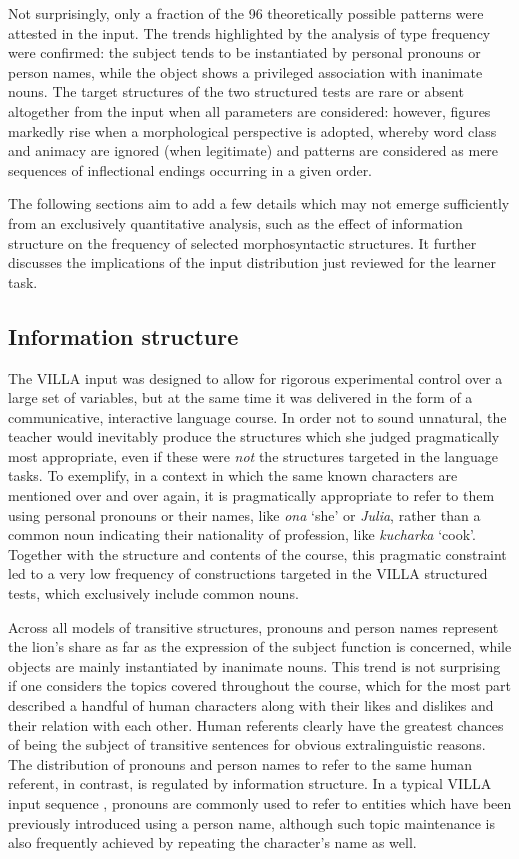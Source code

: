 Not surprisingly, only a fraction of the 96 theoretically possible patterns were attested in the input. The trends highlighted by the analysis of type frequency were confirmed: the subject tends to be instantiated by personal pronouns or person names, while the object shows a privileged association with inanimate nouns. The target structures of the two structured tests are rare or absent altogether from the input when all parameters are considered: however, figures markedly rise when a morphological perspective is adopted, whereby word class and animacy are ignored (when legitimate) and patterns are considered as mere sequences of inflectional endings occurring in a given order.

The following sections aim to add a few details which may not emerge sufficiently from an exclusively quantitative analysis, such as the effect of information structure on the frequency of selected morphosyntactic structures. It further discusses the implications of the input distribution just reviewed for the learner task.

\subsection{Information structure}\label{sec:08:1.1}

The VILLA input was designed to allow for rigorous experimental control over a large set of variables, but at the same time it was delivered in the form of a communicative, interactive language course. In order not to sound unnatural, the teacher would inevitably produce the structures which she judged pragmatically most appropriate, even if these were \textit{not} the structures targeted in the language tasks. To exemplify, in a context in which the same known characters are mentioned over and over again, it is pragmatically appropriate to refer to them using personal pronouns or their names, like \textit{ona} ‘she’ or \textit{Julia}, rather than a common noun indicating their nationality of profession, like \textit{kucharka} ‘cook’. Together with the structure and contents of the course, this pragmatic constraint led to a very low frequency of constructions targeted in the VILLA structured tests, which exclusively include common nouns.

Across all models of transitive structures, pronouns and person names represent the lion's share as far as the expression of the subject function is concerned, while objects are mainly instantiated by inanimate nouns. This trend is not surprising if one considers the topics covered throughout the course, which for the most part described a handful of human characters along with their likes and dislikes and their relation with each other. Human referents clearly have the greatest chances of being the subject of transitive sentences for obvious extralinguistic reasons. The distribution of pronouns and person names to refer to the same human referent, in contrast, is regulated by information structure. In a typical VILLA input sequence , pronouns are commonly used to refer to entities which have been previously introduced using a person name, although such topic maintenance is also frequently achieved by repeating the character’s name as well.

